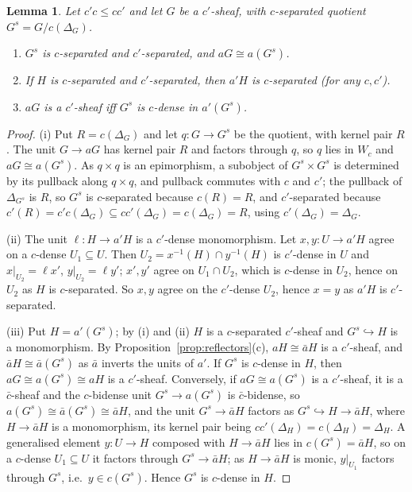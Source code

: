 \documentclass[11pt]{amsart}
\newtheorem{lem}[thm]{Lemma}
\theoremstyle{definition}
\begin{document}
\begin{lem}\label{lem:sepquot}
Let $c'c\le cc'$ and let $G$ be a $c'$-sheaf, with $c$-separated quotient
$G^s=G/c(\Delta_G)$.
\begin{enumerate}
\item[(i)] $G^s$ is $c$-separated and $c'$-separated, and $aG\cong a(G^s)$.
\item[(ii)] If $H$ is $c$-separated and $c'$-separated, then $a'H$ is
$c$-separated (for any $c,c'$).
\item[(iii)] $aG$ is a $c'$-sheaf iff $G^s$ is $c$-dense in $a'(G^s)$.
\end{enumerate}
\end{lem}
\begin{proof}
(i) Put $R=c(\Delta_G)$ and let $q\colon G\to G^s$ be the quotient, with
kernel pair $R$. The unit $G\to aG$ has kernel pair $R$ and factors
through $q$, so $q$ lies in $W_c$ and $aG\cong a(G^s)$. As $q\times q$ is
an epimorphism, a subobject of $G^s\times G^s$ is determined by its
pullback along $q\times q$, and pullback commutes with $c$ and $c'$; the
pullback of $\Delta_{G^s}$ is $R$, so $G^s$ is $c$-separated because
$c(R)=R$, and $c'$-separated because $c'(R)=c'c(\Delta_G)\subseteq
cc'(\Delta_G)=c(\Delta_G)=R$, using $c'(\Delta_G)=\Delta_G$.

(ii) The unit $\ell\colon H\to a'H$ is a $c'$-dense monomorphism. Let
$x,y\colon U\to a'H$ agree on a $c$-dense $U_1\subseteq U$. Then
$U_2=x^{-1}(H)\cap y^{-1}(H)$ is $c'$-dense in $U$ and $x|_{U_2}=\ell x'$,
$y|_{U_2}=\ell y'$; $x',y'$ agree on $U_1\cap U_2$, which is $c$-dense in
$U_2$, hence on $U_2$ as $H$ is $c$-separated. So $x,y$ agree on the
$c'$-dense $U_2$, hence $x=y$ as $a'H$ is $c'$-separated.

(iii) Put $H=a'(G^s)$; by (i) and (ii) $H$ is a $c$-separated $c'$-sheaf
and $G^s\hookrightarrow H$ is a monomorphism. By Proposition~\ref{prop:reflectors}(c), $aH\cong\bar aH$ is a
$c'$-sheaf, and $\bar aH\cong\bar a(G^s)$ as $\bar a$ inverts the units of
$a'$. If $G^s$ is $c$-dense in $H$, then $aG\cong a(G^s)\cong aH$ is a
$c'$-sheaf. Conversely, if $aG\cong a(G^s)$ is a $c'$-sheaf, it is a
$\bar c$-sheaf and the $c$-bidense unit $G^s\to a(G^s)$ is $\bar c$-bidense,
so $a(G^s)\cong\bar a(G^s)\cong\bar aH$, and the unit $G^s\to\bar aH$
factors as $G^s\hookrightarrow H\to\bar aH$, where $H\to\bar aH$ is a
monomorphism, its kernel pair being $cc'(\Delta_H)=c(\Delta_H)=\Delta_H$.
A generalised element $y\colon U\to H$ composed with $H\to\bar aH$ lies in
$c(G^s)=\bar aH$, so on a $c$-dense $U_1\subseteq U$ it factors through
$G^s\to\bar aH$; as $H\to\bar aH$ is monic, $y|_{U_1}$ factors through
$G^s$, i.e.\ $y\in c(G^s)$. Hence $G^s$ is $c$-dense in $H$.
\end{proof}
\end{document}
